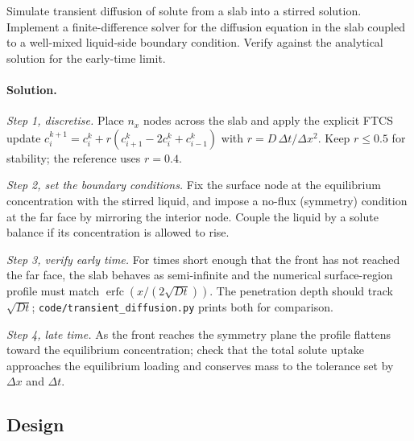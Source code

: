 \begin{exercise}
Simulate transient diffusion of solute from a slab into a stirred
solution. Implement a finite-difference solver for the diffusion
equation in the slab coupled to a well-mixed liquid-side boundary
condition. Verify against the analytical solution for the early-time
limit.

\paragraph{Solution.}
\textit{Step 1, discretise.} Place $n_x$ nodes across the slab and
apply the explicit FTCS update $c_i^{k+1} = c_i^k + r(c_{i+1}^k -
2c_i^k + c_{i-1}^k)$ with $r = D\,\Delta t/\Delta x^2$. Keep $r \le
0.5$ for stability; the reference uses $r = 0.4$.

\textit{Step 2, set the boundary conditions.} Fix the surface node at
the equilibrium concentration with the stirred liquid, and impose a
no-flux (symmetry) condition at the far face by mirroring the interior
node. Couple the liquid by a solute balance if its concentration is
allowed to rise.

\textit{Step 3, verify early time.} For times short enough that the
front has not reached the far face, the slab behaves as semi-infinite
and the numerical surface-region profile must match
$\operatorname{erfc}(x/(2\sqrt{Dt}))$. The penetration depth should
track $\sqrt{Dt}$; \texttt{code/transient\_diffusion.py} prints both
for comparison.

\textit{Step 4, late time.} As the front reaches the symmetry plane the
profile flattens toward the equilibrium concentration; check that the
total solute uptake approaches the equilibrium loading and conserves
mass to the tolerance set by $\Delta x$ and $\Delta t$.
\end{exercise}

\subsection*{Design}


